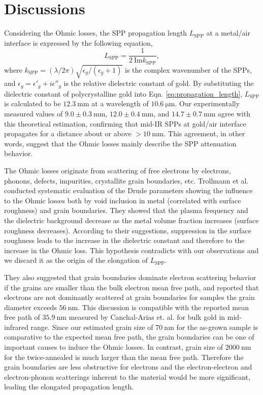 \documentclass[aip,apl,reprint]{revtex4-1}
\begin{document}
\section{Discussions}
\label{sec:discussion}
Considering the Ohmic losses, the SPP propagation length $L_{\mathrm{SPP}}$ at a metal/air interface is expressed by the following equation,
\begin{equation}
 L_{\mathrm{SPP}} = \frac{1}{2\:\mathrm{Im} k_{\mathrm{SPP}}},
\label{eq:propagation_length}
 \end{equation}
where $k_{\mathrm{SPP}}=(\lambda/2\pi)\sqrt{\epsilon_g/(\epsilon_g+1)}$ is the complex wavenumber of the SPPs, and $\epsilon_g=\epsilon'_g+i\epsilon''_g$ is the relative dielectric constant of gold. 
By substituting the dielectric constant of polycrystalline gold\cite{Palik} into Eqn. \ref{eq:propagation_length}, $L_{\mathrm{SPP}}$ is calculated to be $12.3\:\mathrm{mm}$ at a wavelength of $10.6\:\mathrm{\mu m}$.
Our experimentally measured values of  $9.0\pm0.3\:\mathrm{mm}$, $12.0\pm0.4\:\mathrm{mm}$, and $14.7\pm0.7\:\mathrm{mm}$ agree with this theoretical estimation, confirming that mid-IR SPPs at gold/air interface propagates for a distance about or above $>10\:\mathrm{mm}$. 
This agreement, in other words, suggest that the Ohmic losses mainly describe the SPP attenuation behavior.

The Ohmic losses originate from scattering of free electrons by electrons, phonons, defects, impurities, crystallite grain boundaries\cite{Kuttge, Yang, Trollmann}, etc.
Trollmann et al.\cite{Trollmann} conducted systematic evaluation of the Drude parameters showing the influence to the Ohmic losses both by void inclusion in metal (correlated with surface roughness) and grain boundaries. They showed that the plasma frequency and the dielectric background decrease as the metal volume fraction increases (surface roughness decreases). According to their suggestions, suppression in the surface roughness leads to the increase in the dielectric constant and therefore to the increase in the Ohmic loss. This hypothesis contradicts with our observations and we discard it as the origin of the elongation of $L_{\mathrm{SPP}}$. 

They also suggested that grain boundaries dominate electron scattering behavior if the grains are smaller than the bulk electron mean free path, and reported that electrons are not dominantly scattered at grain boundaries for samples the grain diameter exceeds $56\:\mathrm{nm}$. This discussion is compatible with the reported mean free path of $35.9\:\mathrm{nm}$ measured by Canchal-Arias et. al.\cite{Canchal-Arias} for bulk gold in mid-infrared range. Since our estimated grain size of $70\:\mathrm{nm}$ for the as-grown sample is comparative to the expected mean free path, the grain boundaries can be one of important causes to induce the Ohmic losses. In contrast, grain size of $2000\:\mathrm{nm}$ for the twice-annealed is much larger than the mean free path. Therefore the grain boundaries are less obstructive for electrons and the electron-electron and electron-phonon scatterings inherent to the material would be more significant, leading the elongated propagation length. 
\end{document}
